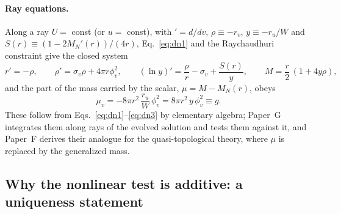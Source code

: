\documentclass[11pt]{article}
\begin{document}
\paragraph{Ray equations.} Along a ray $U=$ const (or $u=$ const), with $'=d/dv$, $\rho\equiv-r_v$, $y\equiv-r_u/W$ and $S(r)\equiv(1-2M_N'(r))/(4r)$, Eq.~\eqref{eq:dn1} and the Raychaudhuri constraint give the closed system
\begin{equation}
r'=-\rho,\qquad \rho'=\sigma_v\rho+4\pi r\phi_v^2,\qquad (\ln y)'=\frac{\rho}{r}-\sigma_v+\frac{S(r)}{y},\qquad M=\frac r2\,(1+4y\rho),
\label{eq:ray}
\end{equation}
and the part of the mass carried by the scalar, $\mu=M-M_N(r)$, obeys
\begin{equation}
\mu_v=-8\pi r^2\,\frac{r_u}{W}\,\phi_v^2=8\pi r^2\,y\,\phi_v^2\equiv g .
\label{eq:muv}
\end{equation}
These follow from Eqs.~\eqref{eq:dn1}--\eqref{eq:dn3} by elementary algebra; Paper~G \citep{PaperG} integrates them along rays of the evolved solution and tests them against it, and Paper~F \citep{PaperF} derives their analogue for the quasi-topological theory, where $\mu$ is replaced by the generalized mass.

\subsection{Why the nonlinear test is additive: a uniqueness statement}
\label{sec:uniq}
\end{document}
